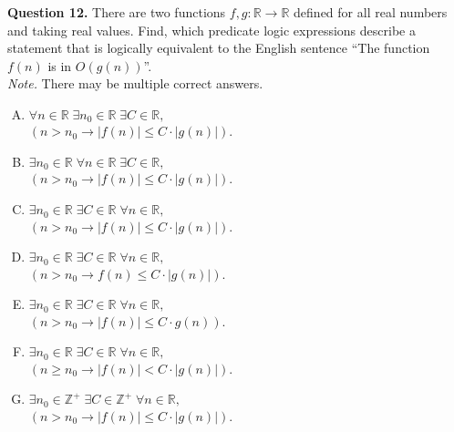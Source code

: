 \documentclass[jou]{apa6}
\begin{document}
\vspace{6pt}
{\bf Question 12.} There are two functions $f,g: \mathbb{R} \rightarrow \mathbb{R}$ defined
for all real numbers and taking real values.
Find, which predicate logic expressions describe a statement that is logically
equivalent to the English sentence ``The function $f(n)$ is in $O(g(n))$''.\\
{\em Note.} There may be multiple correct answers. 

\begin{enumerate}[(A)]
\item $\forall n \in \mathbb{R}\;\exists n_0 \in \mathbb{R}\;\exists C \in \mathbb{R},$\\
$\left(n > n_0 \rightarrow |f(n)| \leq C\cdot{}|g(n)|\right)$. 
\item $\exists n_0 \in \mathbb{R}\;\forall n \in \mathbb{R}\;\exists C \in \mathbb{R},$\\
$(n > n_0 \rightarrow |f(n)| \leq C\cdot{}|g(n)|)$. 
\item $\exists n_0 \in \mathbb{R}\;\exists C \in \mathbb{R}\;\forall n \in \mathbb{R},$\\
$(n > n_0 \rightarrow |f(n)| \leq C\cdot{}|g(n)|)$. 
\item $\exists n_0 \in \mathbb{R}\;\exists C \in \mathbb{R}\;\forall n \in \mathbb{R},$\\
$(n > n_0 \rightarrow f(n) \leq C\cdot{}|g(n)|)$. 
\item $\exists n_0 \in \mathbb{R}\;\exists C \in \mathbb{R}\;\forall n \in \mathbb{R},$\\
$(n > n_0 \rightarrow |f(n)| \leq C\cdot{}g(n))$. 
\item $\exists n_0 \in \mathbb{R}\;\exists C \in \mathbb{R}\;\forall n \in \mathbb{R},$\\
$(n \geq n_0 \rightarrow |f(n)| < C\cdot{}|g(n)|)$. 
\item $\exists n_0 \in \mathbb{Z}^{+}\;\exists C \in \mathbb{Z}^{+}\;\forall n \in \mathbb{R},$\\
$(n > n_0 \rightarrow |f(n)| \leq C\cdot{}|g(n)|)$. 
\end{enumerate}
\end{document}
